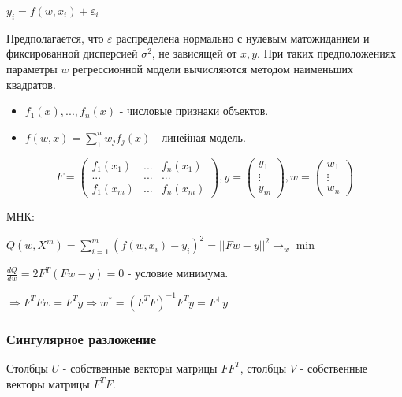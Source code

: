 \documentclass{article}
\begin{document}
$y_i = f(w, x_i) + \varepsilon_i$

Предполагается, что $\varepsilon$ распределена нормально с нулевым матожиданием
и фиксированной дисперсией $\sigma^2$, не зависящей от $x, y$. При таких
предположениях параметры $w$ регрессионной модели вычисляются методом наименьших
квадратов.

\begin{itemize}
	\item $f_1(x), ..., f_n(x)$ - числовые признаки объектов.
	\item $f(w, x) = \sum\limits_1^n w_j f_j(x)$ - линейная модель.
\end{itemize}

\begin{equation}
	F =
	\begin{pmatrix}
		f_1(x_1) & ... & f_n(x_1) \\
		... & ... & ... \\
		f_1(x_m) & ... & f_n(x_m)
	\end{pmatrix},
	y = 
	\begin{pmatrix}
		y_1 \\
		\vdots \\
		y_m
	\end{pmatrix},
	w =
	\begin{pmatrix}
		w_1 \\
		\vdots \\
		w_n
	\end{pmatrix}
\end{equation}

МНК:

$Q(w, X^m) = \sum\limits_{i=1}^m (f(w, x_i) - y_i)^2 = ||F w - y||^2 \to_w \min$

$\frac{d Q}{d w} = 2F^T(F w - y) = 0$ - условие минимума.

$\Rightarrow F^T F w = F^T y \Rightarrow w^* = (F^T F)^{-1}F^T y = F^+ y$

\subsubsection{Сингулярное разложение}


Столбцы $U$ - собственные векторы матрицы $F F^T$, столбцы $V$ - собственные
векторы матрицы $F^T F$.
\end{document}

